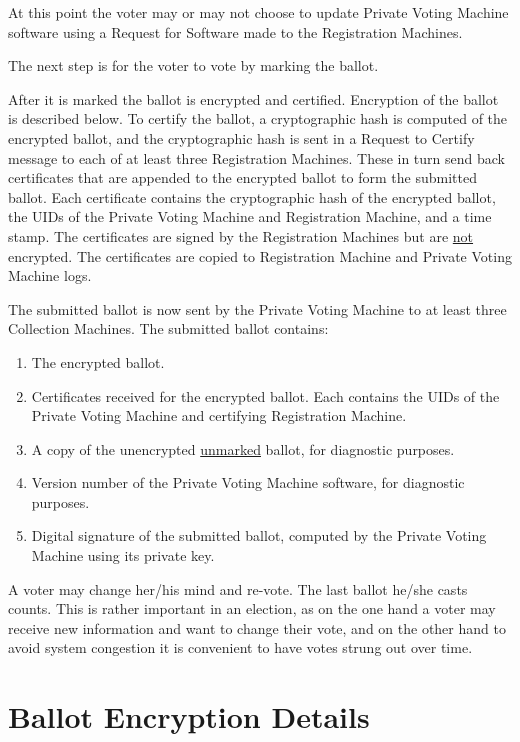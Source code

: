 \documentclass[12pt]{article}
\begin{document}
At this point
the voter may or may not choose to update Private Voting Machine
software using a Request for Software made to the Registration Machines.

The next step is for the voter to vote by marking the ballot.

After it is marked the ballot is encrypted and certified.  Encryption of the
ballot is described below.  To certify the ballot, a cryptographic hash
is computed of the encrypted ballot, and the cryptographic hash is sent
in a Request to Certify message to each of at least three Registration
Machines.  These in turn send back certificates that are appended
to the encrypted ballot to form the submitted ballot.  Each
certificate contains the cryptographic hash of the encrypted ballot, the
UIDs of the Private Voting Machine and Registration Machine,
and a time stamp.  The certificates
are signed by the Registration Machines but are \underline{not} encrypted.
The certificates are copied to Registration Machine and Private Voting
Machine logs.

The submitted ballot is now sent by the Private Voting
Machine to at least three Collection Machines.  The submitted
ballot contains:
\begin{enumerate}
\item The encrypted ballot.
\item Certificates received for the encrypted ballot.  Each contains the
UIDs of the Private Voting Machine and certifying Registration Machine.
\item A copy of the unencrypted \underline{unmarked} ballot, for
diagnostic purposes.
\item Version number of the Private Voting Machine software, for
diagnostic purposes.
\item Digital signature of the submitted ballot, computed by the
Private Voting Machine using its private key.
\end{enumerate}


A voter may change her/his mind and re-vote.  The last ballot
he/she casts counts.  This is rather important in an election,
as on the one hand a voter may receive new information and
want to change their vote, and on the other hand to avoid system
congestion it is convenient to have votes strung out over time.

\section{Ballot Encryption Details}
\end{document}
